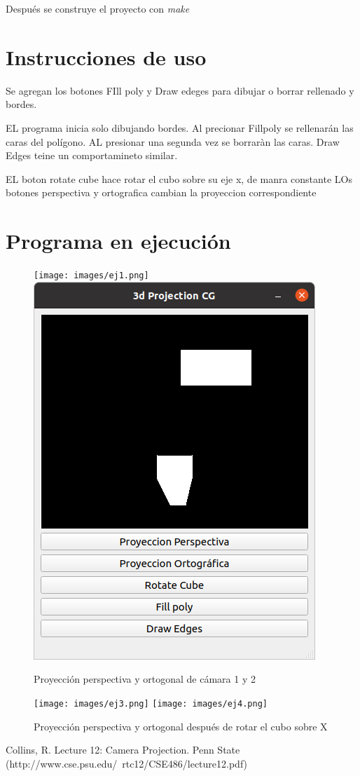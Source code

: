 \documentclass[12pt]{article}
\begin{document}
Después se construye el proyecto con \textit{make}



\section{Instrucciones de uso}

Se agregan los botones FIll poly y Draw edeges para dibujar o borrar rellenado y bordes.

EL programa inicia solo dibujando bordes. Al precionar Fillpoly se rellenarán las caras del polígono. AL presionar una segunda vez se borraràn las caras. Draw Edges teine un comportamineto similar.

EL boton rotate cube hace rotar el cubo sobre su eje x, de manra constante
LOs botones perspectiva y ortografica cambian la proyeccion correspondiente


\section{Programa en ejecución}

\begin{figure}[H]
\centering
\texttt{[image: images/ej1.png]}
\includegraphics[scale=0.5]{images/ej2.png}
\caption{Proyección perspectiva y ortogonal de cámara 1 y 2}
\end{figure}

\begin{figure}[H]
\centering
\texttt{[image: images/ej3.png]}
\texttt{[image: images/ej4.png]}
\caption{Proyección perspectiva y ortogonal después de rotar el cubo sobre X}
\end{figure}


\begin{thebibliography}{99}

 Collins, R. Lecture 12: Camera Projection. Penn State (http://www.cse.psu.edu/~rtc12/CSE486/lecture12.pdf)

\end{thebibliography}
\end{document}
